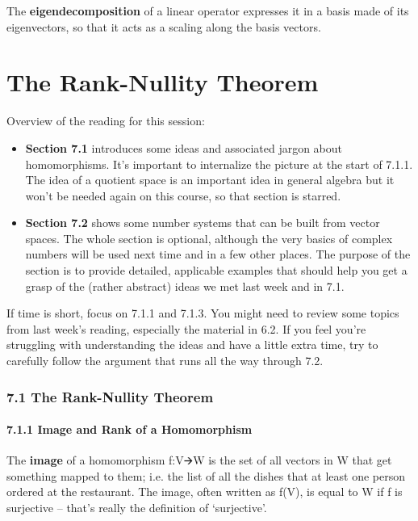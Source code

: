 \documentclass[oneside,english]{amsbook}
\numberwithin{section}{chapter}
\theoremstyle{plain}
\theoremstyle{definition}
\begin{document}
The \textbf{eigendecomposition} of a linear operator expresses it in a
basis made of its eigenvectors, so that it acts as a scaling along the
basis vectors.

\chapter{The Rank-Nullity Theorem}

Overview of the reading for this session:

\begin{itemize}
	\item
	\textbf{Section 7.1} introduces some ideas and associated jargon about
	homomorphisms. It's important to internalize the picture at the start
	of 7.1.1. The idea of a quotient space is an important idea in general
	algebra but it won't be needed again on this course, so that section
	is starred.
	\item
	\textbf{Section 7.2} shows some number systems that can be built from
	vector spaces. The whole section is optional, although the very basics
	of complex numbers will be used next time and in a few other places.
	The purpose of the section is to provide detailed, applicable examples
	that should help you get a grasp of the (rather abstract) ideas we met
	last week and in 7.1.
\end{itemize}

If time is short, focus on 7.1.1 and 7.1.3. You might need to review
some topics from last week's reading, especially the material in 6.2. If
you feel you're struggling with understanding the ideas and have a
little extra time, try to carefully follow the argument that runs all
the way through 7.2.

\subsection{7.1 The Rank-Nullity
	Theorem}\label{the-rank-nullity-theorem-1}

\subsubsection{7.1.1 Image and Rank of a
	Homomorphism}\label{image-and-rank-of-a-homomorphism}

The \textbf{image} of a homomorphism f:V🡪W is the set of all vectors in
W that get something mapped to them; i.e. the list of all the dishes
that at least one person ordered at the restaurant. The image, often
written as f(V), is equal to W if f is surjective -- that's really the
definition of `surjective'.
\end{document}
